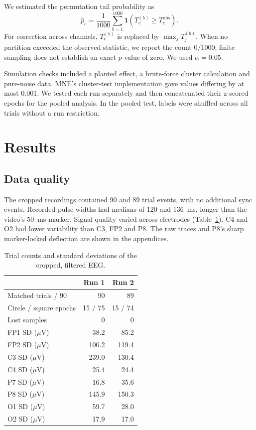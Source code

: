 \documentclass[11pt,a4paper]{article}
\newcommand{\uv}{\ensuremath{\mu\mathrm{V}}}
\begin{document}
We estimated the permutation tail probability as
\begin{equation}
  \hat p_c=\frac{1}{1000}\sum_{b=1}^{1000}
            \mathbf{1}\!\left(T_c^{(b)}\geq T_c^{\mathrm{obs}}\right).
\end{equation}
For correction across channels, $T_c^{(b)}$ is replaced by
$\max_j T_j^{(b)}$. When no partition exceeded the observed statistic, we
report the count $0/1000$; finite sampling does not establish an exact
$p$-value of zero. We used $\alpha=0.05$.

Simulation checks included a planted effect, a brute-force cluster calculation
and pure-noise data. MNE's cluster-test implementation gave values differing
by at most 0.001. We tested each run separately
and then concatenated their z-scored epochs for the pooled analysis. In the
pooled test, labels were shuffled across all trials without a run restriction.

\section{Results}

\subsection{Data quality}

The cropped recordings contained 90 and 89 trial events, with no additional
sync events. Recorded pulse widths had medians of 120 and 136~ms, longer than
the video's 50~ms marker. Signal quality varied across electrodes
(Table~\ref{tab:quality}). C4 and O2 had lower variability than C3, FP2 and P8.
The raw traces and P8's sharp marker-locked deflection are shown in the
appendices.

\begin{table}[H]
  \centering
  \caption{Trial counts and standard deviations of the cropped, filtered EEG.}
  \label{tab:quality}
  \begin{tabular}{lrr}
    \toprule
     & Run 1 & Run 2 \\
    \midrule
    Matched trials / 90 & 90 & 89 \\
    Circle / square epochs & 15 / 75 & 15 / 74 \\
    Lost samples & 0 & 0 \\
    \midrule
    FP1 SD (\uv) & 38.2 & 85.2 \\
    FP2 SD (\uv) & 100.2 & 119.4 \\
    C3 SD (\uv)  & 239.0 & 130.4 \\
    C4 SD (\uv)  & 25.4 & 24.4 \\
    P7 SD (\uv)  & 16.8 & 35.6 \\
    P8 SD (\uv)  & 145.9 & 150.3 \\
    O1 SD (\uv)  & 59.7 & 28.0 \\
    O2 SD (\uv)  & 17.9 & 17.0 \\
    \bottomrule
  \end{tabular}
\end{table}
\end{document}
